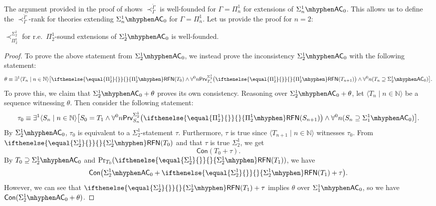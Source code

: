 \documentclass{mhkr}
\newcommand{\added}[1]{#1}
\newcommand{\lag}{\langle}
\newcommand{\rag}{\rangle}
\newcommand{\Prv}{\mathsf{Prv}}
\newcommand{\RFN}[1][]{\ifthenelse{\equal{#1}{}}{}{#1\mhyphen}\mathsf{RFN}}
\newcommand{\AC}{\mathsf{AC}}
\begin{document}
The argument provided in \added{the proof of} \cite[Theorem 3.2]{PakhomovWalsh2021Reflection} shows $\prec^{\check{\Gamma}}_\Gamma$ is well-founded for $\Gamma = \Pi^1_n$ for extensions of $\Sigma^1_n\mhyphen\AC_0$. This allows us to define the $\prec^{\check{\Gamma}}_\Gamma$-rank for theories extending $\Sigma^1_n\mhyphen\AC_0$ for $\Gamma=\Pi^1_n$. Let us provide the proof for $n=2$:
\begin{proposition}[$\Sigma^1_2\mhyphen\AC_0$] \label{Proposition: WFness Pi 1 2 reflection rank}
    $\prec^{\Sigma^1_2}_{\Pi^1_2}$ for r.e.\ $\Pi^1_2$-sound extensions of $\Sigma^1_2\mhyphen\AC_0$ is well-founded.
\end{proposition}
\begin{proof}
    To prove the above statement from $\Sigma^1_2\mhyphen\AC_0$, we instead prove the inconsistency $\Sigma^1_2\mhyphen\AC_0$ with the following statement:
    \begin{equation*}
        \theta \equiv \exists^1 \lag T_n\mid n\in\mathbb{N}\rag \bigl[\RFN[\Pi^1_2](T_0) \land \forall^0 n \Prv_{T_n}^{\Sigma^1_2}\bigl(\RFN[\Pi^1_2](T_{n+1})\bigr) \land \forall^0 n (T_n \supseteq \Sigma^1_2\mhyphen\AC_0)\bigr].
    \end{equation*}
    To prove this, we claim that $\Sigma^1_2\mhyphen\AC_0 + \theta$ proves its own consistency. 
    Reasoning over $\Sigma^1_2\mhyphen\AC_0 + \theta$, let $\lag T_n \mid n\in\mathbb{N}\rag$ be a sequence witnessing $\theta$. Then consider the following statement:
    \begin{equation*}
        \tau_0 \equiv \exists^1 \lag S_n\mid n\in\mathbb{N}\rag  \bigl[S_0 = T_1\land \forall^0 n \Prv_{S_n}^{\Sigma^1_2}\bigl(\RFN[\Pi^1_2](S_{n+1})\bigr) \land \forall^0 n (S_n \supseteq \Sigma^1_1\mhyphen\AC_0)\bigr].
    \end{equation*}
    By $\Sigma^1_2\mhyphen\AC_0$, $\tau_0$ is equivalent to a $\Sigma^1_2$-statement  $\tau$. Furthermore, $\tau$ is true since $\lag T_{n+1}\mid n\in\mathbb{N}\rag$ witnesses $\tau_0$.
    From $\RFN[\Sigma^1_2](T_0)$ and that $\tau$ is true $\Sigma^1_2$, we get
    \begin{equation*}
        \mathsf{Con}(T_0 + \tau).
    \end{equation*}
    By $T_0\supseteq \Sigma^1_2\mhyphen\AC_0$ and $\Pr_{T_0}(\RFN[\Sigma^1_2](T_1))$, we have
    \begin{equation*}
        \mathsf{Con}\bigl(\Sigma^1_2\mhyphen\AC_0 + \RFN[\Sigma^1_2](T_1) + \tau\bigr).
    \end{equation*}
    However, we can see that $\RFN[\Sigma^1_2](T_1) + \tau$ implies $\theta$ over $\Sigma^1_1\mhyphen\AC_0$, so we have $\mathsf{Con}(\Sigma^1_2\mhyphen\AC_0 + \theta)$.
\end{proof}
\end{document}
